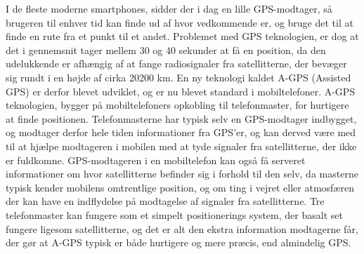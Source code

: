 I de fleste moderne smartphones, sidder der i dag en lille GPS-modtager, så brugeren til enhver tid kan finde ud af hvor vedkommende er, og bruge det til at finde en rute fra et punkt til et andet. Problemet med GPS teknologien, er dog at det i gennemsnit tager mellem 30 og 40 sekunder at få en position, da den udelukkende er afhængig af at fange radiosignaler fra satellitterne, der bevæger sig rundt i en højde af cirka 20200 km.  En ny teknologi kaldet A-GPS (Assisted GPS) er derfor blevet udviklet, og er nu blevet standard i mobiltelefoner. A-GPS teknologien, bygger på mobiltelefoners opkobling til telefonmaster, for hurtigere at finde positionen. Telefonmasterne har typisk selv en GPS-modtager indbygget, og modtager derfor hele tiden informationer fra GPS’er, og kan derved være med til at hjælpe modtageren i mobilen med at tyde signaler fra satellitterne, der ikke er fuldkomne. GPS-modtageren i en mobiltelefon kan også få serveret informationer om hvor satellitterne befinder sig i forhold til den selv, da masterne typisk kender mobilens omtrentlige position, og om ting i vejret eller atmosfæren der kan have en indflydelse på modtagelse af signaler fra satellitterne. 
Tre telefonmaster kan fungere som et simpelt positionerings system, der basalt set fungere ligesom satellitterne, og det er alt den ekstra information modtagerne får, der gør at A-GPS typisk er både hurtigere og mere præcis, end almindelig GPS.


